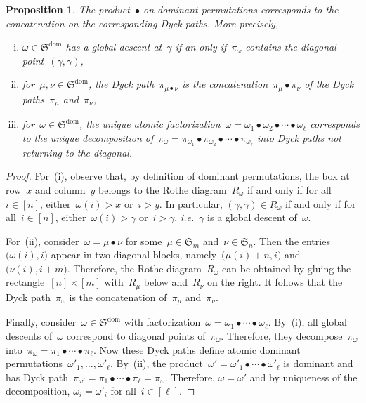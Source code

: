 \documentclass{amsart}
\newtheorem{proposition}[theorem]{Proposition}
\theoremstyle{definition}
\newcommand{\ie}{\textit{i.e.}~} %
\newcommand{\fS}{\mathfrak{S}} %
\newcommand{\gdproduct}{\bullet} %
\newcommand{\Sdom}{\fS^{\operatorname{dom}}} %
\begin{document}
\begin{proposition}
\label{prop:gdproductDominant}
The product~$\gdproduct$ on dominant permutations corresponds to the concatenation on the corresponding Dyck paths. More precisely,
\begin{enumerate}[(i)]
\item $\omega \in \Sdom$ has a global descent at~$\gamma$ if an only if~$\pi_\omega$ contains the diagonal point~$(\gamma, \gamma)$,
\item for~$\mu, \nu \in \Sdom$, the Dyck path~$\pi_{\mu \gdproduct \nu}$ is the concatenation~$\pi_\mu \gdproduct \pi_\nu$ of the Dyck paths~$\pi_\mu$ and~$\pi_\nu$,
\item for~$\omega \in \Sdom$, the unique atomic factorization~$\omega = \omega_1 \gdproduct \omega_2 \gdproduct \cdots \gdproduct \omega_\ell$ corresponds to the unique decomposition of~$\pi_\omega = \pi_{\omega_1} \gdproduct \pi_{\omega_2} \gdproduct \cdots \gdproduct \pi_{\omega_\ell}$ into Dyck paths not returning to the diagonal.
\end{enumerate}
\end{proposition}

\begin{proof}
For~(i), observe that, by definition of dominant permutations, the box at row~$x$ and column~$y$ belongs to the Rothe diagram~$R_\omega$ if and only if for all~$i \in [n]$, either~$\omega(i) > x$ or~$i > y$. In particular, $(\gamma, \gamma) \in R_\omega$ if and only if for all~$i \in [n]$, either~$\omega(i) > \gamma$ or~$i > \gamma$, \ie $\gamma$ is a global descent of~$\omega$.

For~(ii), consider~$\omega = \mu \gdproduct \nu$ for some~$\mu \in \fS_m$ and~$\nu \in \fS_n$. Then the entries~$\big( \omega(i), i \big)$ appear in two diagonal blocks, 
namely~$\big( \mu(i) + n, i \big)$ and~$\big( \nu(i), i + m \big)$. 
Therefore, the Rothe diagram~$R_\omega$ can be obtained by gluing the rectangle~$[n] \times [m]$ with~$R_\mu$ below and~$R_\nu$ on the right. It follows that the Dyck path~$\pi_\omega$ is the concatenation of~$\pi_\mu$ and~$\pi_\nu$.

Finally, consider~$\omega \in \Sdom$ with factorization~$\omega = \omega_1 \gdproduct \cdots \gdproduct \omega_\ell$. By~(i), all global descents of~$\omega$ correspond to diagonal points of~$\pi_\omega$. Therefore, they decompose~$\pi_\omega$ into~$\pi_\omega = \pi_1 \gdproduct \cdots \gdproduct \pi_\ell$. Now these Dyck paths define atomic dominant permutations~$\omega'_1, \dots, \omega'_\ell$. By~(ii), the product~$\omega' = \omega'_1 \gdproduct \cdots \gdproduct \omega'_\ell$ is dominant and has Dyck path~$\pi_{\omega'} = \pi_1 \gdproduct \cdots \gdproduct \pi_\ell = \pi_\omega$. Therefore, $\omega = \omega'$ and by uniqueness of the decomposition, $\omega_i = \omega'_i$ for all~$i \in [\ell]$.
\end{proof}
\end{document}
